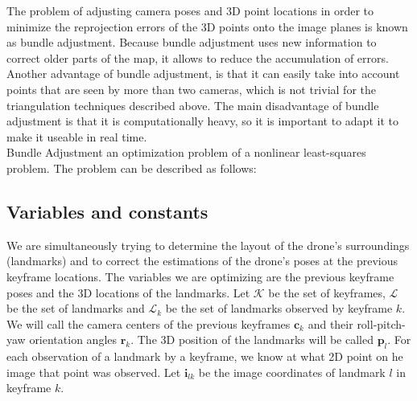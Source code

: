 The problem of adjusting camera poses and 3D point locations in order to minimize the reprojection errors of the 3D points onto the image planes is known as bundle adjustment. Because bundle adjustment uses new information to correct older parts of the map, it allows to reduce the accumulation of errors. Another advantage of bundle adjustment, is that it can easily take into account points that are seen by more than two cameras, which is not trivial for the triangulation techniques described above. The main disadvantage of bundle adjustment is that it is computationally heavy, so it is important to adapt it to make it useable in real time.\\

Bundle Adjustment an optimization problem of a nonlinear least-squares problem. The problem can be described as follows:

\subsection{Variables and constants}
We are simultaneously trying to determine the layout of the drone's surroundings (landmarks) and to correct the estimations of the drone's poses at the previous keyframe locations. The variables we are optimizing are the previous keyframe poses and the 3D locations of the landmarks. Let $\mathcal{K}$ be the set of keyframes, $\mathcal{L}$ be the set of landmarks and $\mathcal{L}_k$ be the set of landmarks observed by keyframe $k$. We will call the camera centers of the previous keyframes $\mathbf{c}_k$ and their roll-pitch-yaw orientation angles $\mathbf{r}_k$. The 3D position of the landmarks will be called $\mathbf{p}_l$. For each observation of a landmark by a keyframe, we know at what 2D point on he image that point was observed. Let $\mathbf{i}_{lk}$ be the image coordinates of landmark $l$ in keyframe $k$.

